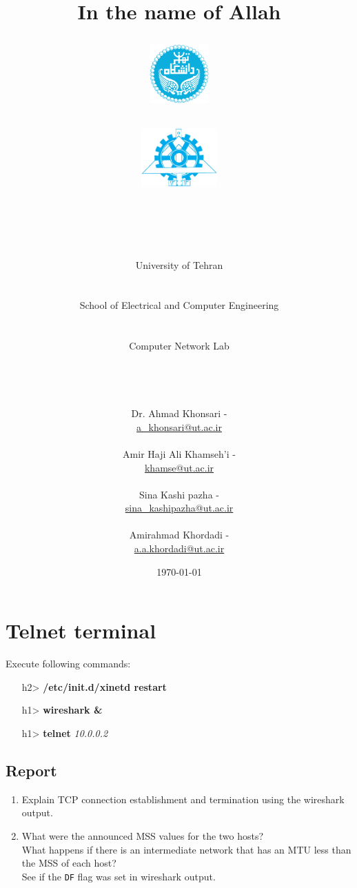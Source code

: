 \documentclass[10pt,a4paper]{article}
\title{
\normalsize In the name of Allah\\
\vspace{10pt}
\LARGE\FR{بسم \allah الرحمن الرحیم}
\vspace{10pt}
\begin{center}
	\begin{minipage}{0.48\textwidth} \begin{flushleft}
			\includegraphics[height=64pt,width=64pt]{img/logo.png}
	\end{flushleft}\end{minipage}
	\begin{minipage}{0.48\textwidth} \begin{flushright}
			\includegraphics[height=64pt]{img/eng-logo.png}
	\end{flushright}\end{minipage}
\end{center}
\vspace*{-64pt}
	\huge \titleText\\
\vspace{40pt}
}
\author{
	\huge University of Tehran\\
	\LARGE \FR{دانشگاه تهران}\\
	\\
	\LARGE School of Electrical and Computer Engineering\\
	\FR{دانشکده مهندسی برق و کامپیوتر}\\
	\\
	\Large Computer Network Lab\\
	\FR{آزمایشگاه شبکه‌های کامپیوتری}\\
	\\
	\\
	\\
	\normalfont
	Dr. Ahmad Khonsari - \FR{احمد خونساری}\\
	\href{mailto:a_khonsari@ut.ac.ir}{a\_khonsari@ut.ac.ir}\\
	\\
	\normalsize
	Amir Haji Ali Khamseh'i - \FR{امیر حاجی علی خمسه‌ء}\\
	\href{mailto:khamse@ut.ac.ir}{khamse@ut.ac.ir}\\
	\\
	\normalsize
	Sina Kashi pazha - \FR{سینا کاشی پزها}\\
	\href{mailto:sina\_kashipazha@ut.ac.ir}{sina\_kashipazha@ut.ac.ir}\\
	\\
	\normalsize
	Amirahmad Khordadi - \FR{امیر احمد خردادی}\\
	\href{mailto:a.a.khordadi@ut.ac.ir}{a.a.khordadi@ut.ac.ir}
}
\date{\vspace{30pt}\today\\\vspace{10pt}{\selectlanguage{farsi}\today}}
\numberwithin{equation}{section}
\numberwithin{figure}{section}
\numberwithin{table}{section}
\begin{document}

\maketitle


\pagebreak




\section*{Telnet terminal}
	Execute following commands: \\
	\begin{itemize}
		\item [h2>] \textbf{/etc/init.d/xinetd restart}
		\item [h1>] \textbf{wireshark \&}
		\item [h1>] \textbf{telnet} \textit{10.0.0.2}
	\end{itemize}
	\subsection*{Report}
	\begin{enumerate}
		\item Explain TCP connection establishment and termination using the wireshark output.
		\item What were the announced MSS values for the two hosts? \\
		What happens if there is an intermediate network that has an MTU less than the MSS of each host? \\
		See if the \texttt{DF} flag was set in wireshark output.
	\end{enumerate}
    
\end{document}
